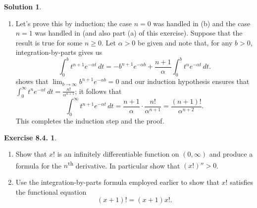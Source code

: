 \documentclass[12pt]{article}
\theoremstyle{definition}
\theoremstyle{exercise}
\newtheorem{exercise}{Exercise 8.4.}
\theoremstyle{solution}
\newtheorem*{solution}{Solution}
\newcommand{\ts}{\textsuperscript}
\begin{document}
\begin{solution}
\begin{enumerate}
        \item Let's prove this by induction; the case \( n = 0 \) was handled in  (b) and the case \( n = 1 \) was handled in  (and also part (a) of this exercise). Suppose that the result is true for some \( n \geq 0 \). Let \( \alpha > 0 \) be given and note that, for any \( b > 0 \), integration-by-parts gives us
        \[
            \int_0^b t^{n+1} e^{-\alpha t} \, dt = -b^{n+1} e^{-\alpha b} + \frac{n + 1}{\alpha} \int_0^b t^n e^{-\alpha t} \, dt.
        \]
         shows that \( \lim_{b \to \infty} b^{n+1} e^{-\alpha b} = 0 \) and our induction hypothesis ensures that \( \int_0^{\infty} t^n e^{-\alpha t} \, dt = \frac{n!}{\alpha^{n+1}} \); it follows that
        \[
            \int_0^{\infty} t^{n+1} e^{-\alpha t} \, dt = \frac{n + 1}{\alpha} \cdot \frac{n!}{\alpha^{n+1}} = \frac{(n + 1)!}{\alpha^{n+2}}.
        \]
        This completes the induction step and the proof.
    \end{enumerate}
\end{solution}

\begin{exercise}
\label{ex:20}
    \begin{enumerate}
        \item Show that \( x! \) is an infinitely differentiable function on \( (0, \infty) \) and produce a formula for the \( n \)\ts{th} derivative. In particular show that \( (x!)'' > 0 \).

        \item Use the integration-by-parts formula employed earlier to show that \( x! \) satisfies the functional equation
        \[
            (x + 1)! = (x + 1)x!.
        \]
    \end{enumerate}
\end{exercise}
\end{document}
